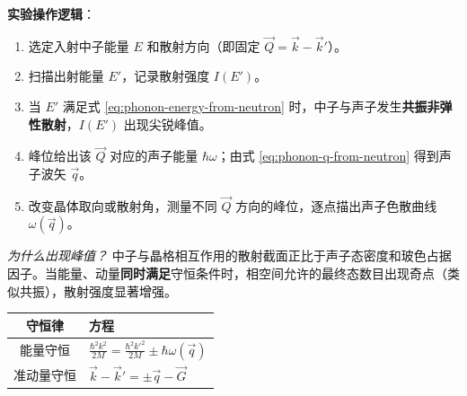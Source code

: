 \begin{derivationbox}[标准解题过程]
\textbf{实验操作逻辑}：
\begin{enumerate}
    \item 选定入射中子能量 $E$ 和散射方向（即固定 $\vec Q=\vec k-\vec k'$）。
    \item 扫描出射能量 $E'$，记录散射强度 $I(E')$。
    \item 当 $E'$ 满足式 \eqref{eq:phonon-energy-from-neutron} 时，中子与声子发生\textbf{共振非弹性散射}，$I(E')$ 出现尖锐峰值。
    \item 峰位给出该 $\vec Q$ 对应的声子能量 $\hbar\omega$；由式 \eqref{eq:phonon-q-from-neutron} 得到声子波矢 $\vec q$。
    \item 改变晶体取向或散射角，测量不同 $\vec Q$ 方向的峰位，逐点描出声子色散曲线 $\omega(\vec q)$。
\end{enumerate}

\textit{为什么出现峰值？} 中子与晶格相互作用的散射截面正比于声子态密度和玻色占据因子。当能量、动量\textbf{同时满足}守恒条件时，相空间允许的最终态数目出现奇点（类似共振），散射强度显著增强。
\end{derivationbox}

\begin{formulabox}[守恒方程汇总]
\begin{center}
\begin{tabular}{cl}
\toprule
守恒律 & 方程 \\
\midrule
能量守恒 & $\displaystyle \frac{\hbar^2k^2}{2M} = \frac{\hbar^2k'^2}{2M} \pm \hbar\omega(\vec q)$ \\[10pt]
准动量守恒 & $\displaystyle \vec k - \vec k' = \pm\vec q - \vec G$ \\
\bottomrule
\end{tabular}
\end{center}
\end{formulabox}

